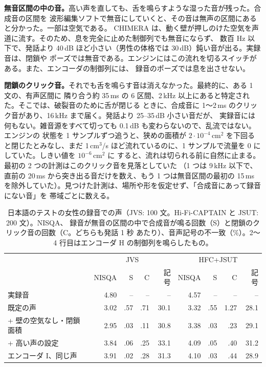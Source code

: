 \documentclass[10pt,a4paper,twocolumn]{article}
\begin{document}
\textbf{無音区間の中の音。}高い声を直しても、舌を鳴らすような湿った音が残った。合成音の区間を
波形編集ソフトで無音にしていくと、その音は無声の区間にあると分かった。一部は空気である。
CHIMERA は、動く壁が押しのけた空気を声道に流す。そのため、息を完全に止めた制御列でも無音にならず、
数百 Hz 以下で、発話より 40\,dB ほど小さい（男性の体格では 30\,dB）鈍い音が出る。実録音は、閉鎖や
ポーズでは無音である。エンジンにはこの流れを切るスイッチがある。また、エンコーダの制御列には、
録音のポーズでは息を出させない。

\textbf{閉鎖のクリック音。}それでも舌を鳴らす音は消えなかった。最終的に、ある 1 文の、有声区間に
隣り合う約 35\,ms の 6 区間、2\,kHz 以上にあると特定された。そこでは、破裂音のために舌が閉じる
ときに、合成音に 1〜2\,ms のクリック音があり、16\,kHz まで届く。発話より 25--35\,dB 小さい音だが、
実録音には何もない。雑音源をすべて切っても 0.1\,dB も変わらないので、乱流ではない。エンジンの
状態を 1 サンプルずつ追うと、狭めの面積が $2\cdot10^{-4}$\,cm$^2$ を下回ると閉じたとみなし、まだ
1\,cm$^3$/s ほど流れているのに、1 サンプルで流量を 0 にしていた。しきい値を $10^{-6}$\,cm$^2$ に
すると、流れは切られる前に自然に止まる。最初の 2 つの計測はこのクリック音を見落としていた
（1 つは 9\,kHz 以下で、直前の 20\,ms から突き出る音だけを数え、もう 1 つは無音区間の最初の
15\,ms を除外していた）。見つけた計測は、場所や形を仮定せず、「合成音にあって録音にない音」を
帯域ごとに数える。

\begin{table}[t]
\centering\scriptsize\setlength{\tabcolsep}{1.7pt}
\caption{日本語のテストの女性の録音での声（JVS: 100 文。Hi-Fi-CAPTAIN と JSUT: 200 文）。NISQA、
録音が無音の区間の中で合成音が鳴る回数（S）と閉鎖のクリック音の回数（C。どちらも発話 1 秒
あたり）、音声記号の不一致（\%）。2〜4 行目はエンコーダ H の制御列を鳴らしたもの。}
\label{tab:voice}
\begin{tabular}{@{}lrrrrrrrr@{}}
\toprule
& \multicolumn{4}{c}{JVS} & \multicolumn{4}{c}{HFC+JSUT}\\
& NISQA & S & C & 記号 & NISQA & S & C & 記号\\
\midrule
実録音 & 4.80 & -- & -- & -- & 4.57 & -- & -- & --\\
既定の声 & 3.02 & .57 & .71 & 30.1 & 3.32 & .55 & 1.27 & 28.1\\
+ 壁の空気なし・閉鎖面積 & 2.95 & .03 & .11 & 30.8 & 3.38 & .03 & .23 & 29.1\\
+ 高い声の設定 & 3.84 & .06 & .25 & 33.1 & 4.09 & .05 & .40 & 31.2\\
エンコーダ I、同じ声 & 3.91 & .02 & .28 & 31.3 & 4.10 & .03 & .44 & 28.9\\
\bottomrule
\end{tabular}
\end{table}
\end{document}
